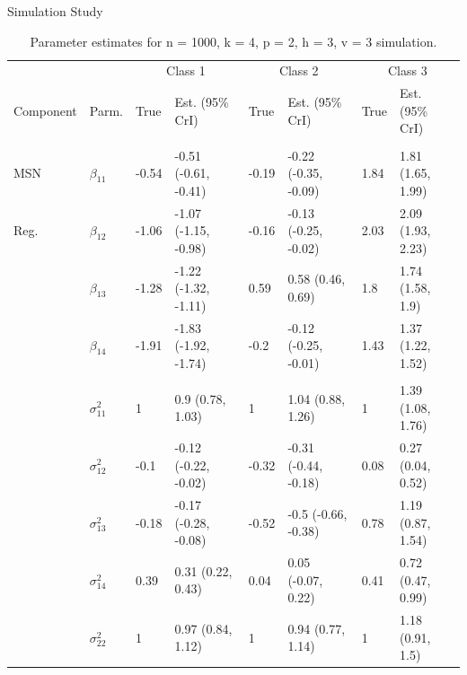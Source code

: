 \documentclass[final]{beamer}
\newlength{\onecolwid}
\newlength{\twocolwid}
\begin{document}
\begin{frame}[t]
\begin{columns}[t]
\begin{column}{\twocolwid}
\begin{columns}[t,totalwidth=\twocolwid]
\begin{column}{\onecolwid}
\begin{block}{Simulation Study}

\begin{table}[t]

\caption{\label{tab:unnamed-chunk-4}Parameter estimates for n = 1000, k = 4, p = 2, h = 3, v = 3 simulation.}
\centering
\fontsize{20}{20}\selectfont
\begin{tabular}{llllllll}
\toprule
\multicolumn{2}{c}{ } & \multicolumn{2}{c}{Class 1} & \multicolumn{2}{c}{Class 2} & \multicolumn{2}{c}{Class 3} \\
\cmidrule(l{3pt}r{3pt}){3-4} \cmidrule(l{3pt}r{3pt}){5-6} \cmidrule(l{3pt}r{3pt}){7-8}
Component & Parm. & True & Est. (95\% CrI) & True & Est. (95\% CrI) & True & Est. (95\% CrI)\\
\midrule
\addlinespace[0.3em]
\multicolumn{8}{l}{\textbf{ }}\\
\hspace{1em}MSN & $\beta_{11}$ & -0.54 & -0.51 (-0.61, -0.41) & -0.19 & -0.22 (-0.35, -0.09) & 1.84 & 1.81 (1.65, 1.99)\\
\hspace{1em}Reg. & $\beta_{12}$ & -1.06 & -1.07 (-1.15, -0.98) & -0.16 & -0.13 (-0.25, -0.02) & 2.03 & 2.09 (1.93, 2.23)\\
\hspace{1em} & $\beta_{13}$ & -1.28 & -1.22 (-1.32, -1.11) & 0.59 & 0.58 (0.46, 0.69) & 1.8 & 1.74 (1.58, 1.9)\\
\hspace{1em} & $\beta_{14}$ & -1.91 & -1.83 (-1.92, -1.74) & -0.2 & -0.12 (-0.25, -0.01) & 1.43 & 1.37 (1.22, 1.52)\\

\addlinespace[0.3em]
\multicolumn{8}{l}{\textbf{ }}\\
\hspace{1em} & $\sigma^2_{11}$ & 1 & 0.9 (0.78, 1.03) & 1 & 1.04 (0.88, 1.26) & 1 & 1.39 (1.08, 1.76)\\
\hspace{1em} & $\sigma^2_{12}$ & -0.1 & -0.12 (-0.22, -0.02) & -0.32 & -0.31 (-0.44, -0.18) & 0.08 & 0.27 (0.04, 0.52)\\
\hspace{1em} & $\sigma^2_{13}$ & -0.18 & -0.17 (-0.28, -0.08) & -0.52 & -0.5 (-0.66, -0.38) & 0.78 & 1.19 (0.87, 1.54)\\
\hspace{1em} & $\sigma^2_{14}$ & 0.39 & 0.31 (0.22, 0.43) & 0.04 & 0.05 (-0.07, 0.22) & 0.41 & 0.72 (0.47, 0.99)\\
\hspace{1em} & $\sigma^2_{22}$ & 1 & 0.97 (0.84, 1.12) & 1 & 0.94 (0.77, 1.14) & 1 & 1.18 (0.91, 1.5)\\


\end{tabular}
\end{table}
\end{block}
\end{column}
\end{columns}
\end{column}
\end{columns}
\end{frame}
\end{document}
